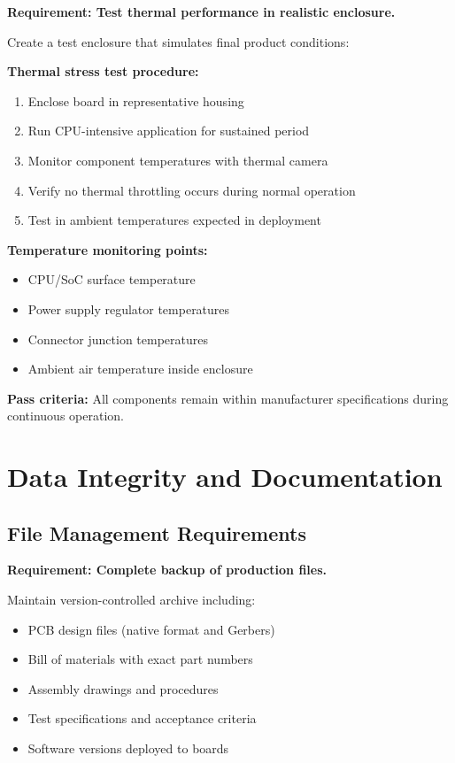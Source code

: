 \textbf{Requirement: Test thermal performance in realistic enclosure.}

Create a test enclosure that simulates final product conditions:

\textbf{Thermal stress test procedure:}
\begin{enumerate}
\item Enclose board in representative housing
\item Run CPU-intensive application for sustained period
\item Monitor component temperatures with thermal camera
\item Verify no thermal throttling occurs during normal operation
\item Test in ambient temperatures expected in deployment
\end{enumerate}

\textbf{Temperature monitoring points:}
\begin{itemize}
\item CPU/SoC surface temperature
\item Power supply regulator temperatures
\item Connector junction temperatures
\item Ambient air temperature inside enclosure
\end{itemize}

\textbf{Pass criteria:} All components remain within manufacturer specifications during continuous operation.

\section{Data Integrity and Documentation}

\subsection{File Management Requirements}

\textbf{Requirement: Complete backup of production files.}

Maintain version-controlled archive including:
\begin{itemize}
\item PCB design files (native format and Gerbers)
\item Bill of materials with exact part numbers
\item Assembly drawings and procedures
\item Test specifications and acceptance criteria
\item Software versions deployed to boards
\end{itemize}

